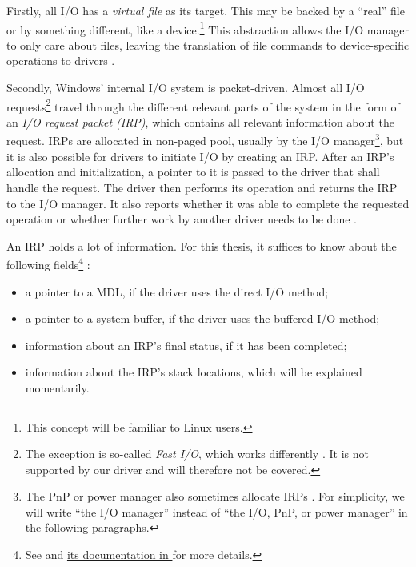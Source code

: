 Firstly, all I/O has a \emph{virtual file} as its target. This may be backed by a ``real'' file or by something different, like a device.\footnote{\label{fn:background.kerneldriver.virtualfiles} This concept will be familiar to Linux users.} This abstraction allows the I/O manager to only care about files, leaving the translation of file commands to device-specific operations to drivers \cite{Yosifovich2017}. 

Secondly, Windows' internal I/O system is packet-driven. Almost all I/O requests\footnote{\label{fn:background.kerneldriver.fastio} The exception is so-called \emph{Fast I/O}, which works differently \cite{Yosifovich2017}. It is not supported by our driver and will therefore not be covered.} travel through the different relevant parts of the system in the form of an \emph{I/O request packet (IRP)}, which contains all relevant information about the request. IRPs are allocated in non-paged pool, usually by the I/O manager\footnote{\label{fn:background.kerneldriver.irpallocation} The PnP or power manager also sometimes allocate IRPs \cite{Yosifovich2017}. For simplicity, we will write ``the I/O manager'' instead of ``the I/O, PnP, or power manager'' in the following paragraphs.}, but it is also possible for drivers to initiate I/O by creating an IRP. After an IRP's allocation and initialization, a pointer to it is passed to the driver that shall handle the request. The driver then performs its operation and returns the IRP to the I/O manager. It also reports whether it was able to complete the requested operation or whether further work by another driver needs to be done \cite{Yosifovich2017}.

An IRP holds a lot of information. For this thesis, it suffices to know about the following fields\footnote{\label{fn:background.kerneldriver.irp} See \cite{Yosifovich2017} and \href{https://docs.microsoft.com/en-us/windows-hardware/drivers/ddi/wdm/ns-wdm-_irp}{its documentation in \cite{Wdk}} for more details.} \cite{Yosifovich2017}:
\begin{itemize}
	\item a pointer to a MDL, if the driver uses the direct I/O method;
	\item a pointer to a system buffer, if the driver uses the buffered I/O method;
	\item information about an IRP's final status, if it has been completed;
	\item information about the IRP's stack locations, which will be explained momentarily.
\end{itemize}

